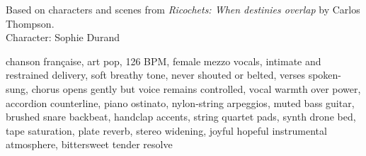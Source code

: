 
\begin{notes}
Based on characters and scenes from \emph{Ricochets: When destinies overlap} by Carlos Thompson.\\
Character: Sophie Durand
\end{notes}
\begin{style}
chanson française, art pop, 126 BPM, female mezzo vocals, intimate and restrained delivery, soft breathy tone, never shouted or belted, verses spoken-sung, chorus opens gently but voice remains controlled, vocal warmth over power, accordion counterline, piano ostinato, nylon-string arpeggios, muted bass guitar, brushed snare backbeat, handclap accents, string quartet pads, synth drone bed, tape saturation, plate reverb, stereo widening, joyful hopeful instrumental atmosphere, bittersweet tender resolve
\end{style}
